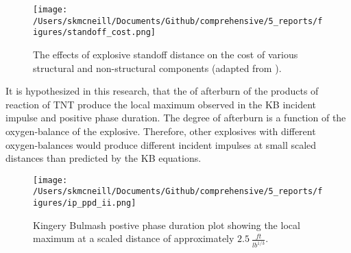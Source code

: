 \begin{figure}[tb]
  \begin{center}
   \texttt{[image: /Users/skmcneill/Documents/Github/comprehensive/5\_reports/figures/standoff\_cost.png]}
  \end{center}
  \caption{The effects of explosive standoff distance on the cost of various structural and non-structural components (adapted from \citep{Smith2016}).}
\label{fig:KB_cost}
\end{figure}%

It is hypothesized in this research, that the of afterburn of the products of reaction of TNT produce the local maximum observed in the KB incident impulse and positive phase duration.  The degree of afterburn is a function of the oxygen-balance of the explosive.  Therefore, other explosives with different oxygen-balances would produce different incident impulses at small scaled distances than predicted by the KB equations.
  
  
\begin{figure}[tb]
  \begin{center}
   \texttt{[image: /Users/skmcneill/Documents/Github/comprehensive/5\_reports/figures/ip\_ppd\_ii.png]}
  \end{center}
  \caption{Kingery Bulmash postive phase duration plot showing the local maximum at a scaled distance of approximately $2.5\:\frac{ft}{lb^{1/3}}$\citep{Kingery1984}.}
\label{fig:KB_ppd}
\end{figure}%


